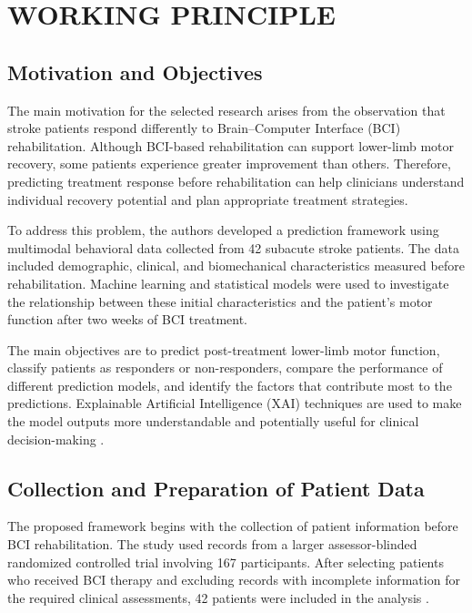 \chapter{\MakeUppercase{Working Principle}}
\setcounter{equation}{0}

\section{{Motivation and Objectives}}

The main motivation for the selected research arises from the observation that stroke patients respond differently to Brain--Computer Interface (BCI) rehabilitation. Although BCI-based rehabilitation can support lower-limb motor recovery, some patients experience greater improvement than others. Therefore, predicting treatment response before rehabilitation can help clinicians understand individual recovery potential and plan appropriate treatment strategies.

To address this problem, the authors developed a prediction framework using multimodal behavioral data collected from 42 subacute stroke patients. The data included demographic, clinical, and biomechanical characteristics measured before rehabilitation. Machine learning and statistical models were used to investigate the relationship between these initial characteristics and the patient's motor function after two weeks of BCI treatment.

The main objectives are to predict post-treatment lower-limb motor function, classify patients as responders or non-responders, compare the performance of different prediction models, and identify the factors that contribute most to the predictions. Explainable Artificial Intelligence (XAI) techniques are used to make the model outputs more understandable and potentially useful for clinical decision-making \cite{bib1}.

\section{{Collection and Preparation of Patient Data}}

The proposed framework begins with the collection of patient information before BCI rehabilitation. The study used records from a larger assessor-blinded randomized controlled trial involving 167 participants. After selecting patients who received BCI therapy and excluding records with incomplete information for the required clinical assessments, 42 patients were included in the analysis \cite{bib1}.

